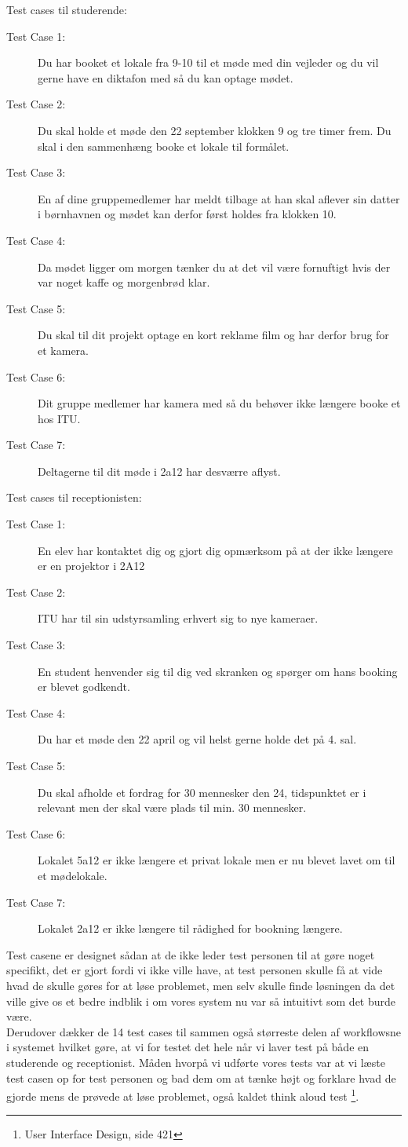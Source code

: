 Test cases til studerende:
\begin{description}
\item [Test Case 1:] Du har booket et lokale fra 9-10 til et møde med din vejleder og du vil gerne have en diktafon med så du kan optage mødet.
\item [Test Case 2:] Du skal holde et møde den 22 september klokken 9 og tre timer frem. Du skal i den sammenhæng booke et lokale til formålet.
\item [Test Case 3:] En af dine gruppemedlemer har meldt tilbage at han skal aflever sin datter i børnhavnen og mødet kan derfor først holdes fra klokken 10.
\item [Test Case 4:] Da mødet ligger om morgen tænker du at det vil være fornuftigt hvis der var noget kaffe og morgenbrød klar.
\item [Test Case 5:] Du skal til dit projekt optage en kort reklame film og har derfor brug for et kamera.
\item [Test Case 6:] Dit gruppe medlemer har kamera med så du behøver ikke længere booke et hos ITU.
\item [Test Case 7:] Deltagerne til dit møde i 2a12 har desværre aflyst.
\end{description}
Test cases til receptionisten:
\begin{description}
\item [Test Case 1:] En elev har kontaktet dig og gjort dig opmærksom på at der ikke længere er en projektor i 2A12
\item [Test Case 2:] ITU har til sin udstyrsamling erhvert sig to nye kameraer.
\item [Test Case 3:] En student henvender sig til dig ved skranken og spørger om hans booking er blevet godkendt.
\item [Test Case 4:] Du har et møde den 22 april og vil helst gerne holde det på 4. sal.
\item [Test Case 5:] Du skal afholde et fordrag for 30 mennesker den 24, tidspunktet er i relevant men der skal være plads til min. 30 mennesker.
\item [Test Case 6:] Lokalet 5a12 er ikke længere et privat lokale men er nu blevet lavet om til et mødelokale.
\item [Test Case 7:] Lokalet 2a12 er ikke længere til rådighed for bookning længere.
\end{description}

Test casene er designet sådan at de ikke leder test personen til at gøre noget specifikt, det er gjort fordi vi ikke ville have, at test personen skulle få at vide hvad de skulle gøres for at løse problemet, men selv skulle finde løsningen da det ville give os et bedre indblik i om vores system nu var så intuitivt som det burde være.\\ Derudover dækker de 14 test cases til sammen også størreste delen af workflowsne i systemet hvilket gøre, at vi for testet det hele når vi laver test på både en studerende og receptionist. Måden hvorpå vi udførte vores tests var at vi læste test casen op for test personen og  bad dem om at tænke højt og forklare hvad de gjorde mens de prøvede at løse problemet, også kaldet think aloud test \footnote{User Interface Design, side 421}. 


